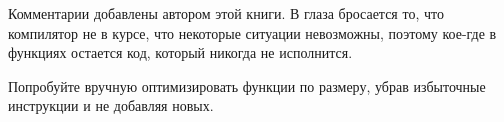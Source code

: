 




Комментарии добавлены автором этой книги.
В глаза бросается то, что компилятор не в курсе, что некоторые ситуации невозможны,
поэтому кое-где в функциях остается код, который никогда не исполнится.

\mysubparagraph{\Exercise}

Попробуйте вручную оптимизировать функции по размеру, убрав избыточные инструкции и не добавляя новых.
